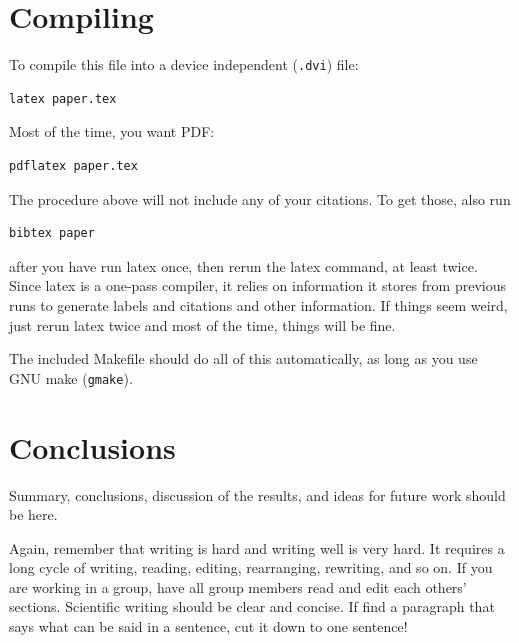 \documentclass[12pt]{article}
\begin{document}
\section{Compiling}
\label{sec:building}

To compile this file into a device independent ({\tt .dvi}) file:

\begin{verbatim}
latex paper.tex
\end{verbatim}

Most of the time, you want PDF:

\begin{verbatim}
pdflatex paper.tex
\end{verbatim}

The procedure above will not include any of your citations.  To get
those, also run
\begin{verbatim}
bibtex paper
\end{verbatim}
after you have run latex once, then rerun the latex command, at least
twice.  Since latex is a one-pass compiler, it relies on information
it stores from previous runs to generate labels and citations and
other information.  If things seem weird, just rerun latex twice and
most of the time, things will be fine.

The included Makefile should do all of this automatically, as long as
you use GNU make ({\tt gmake}).

\section{Conclusions}
\label{sec:conclusions}

Summary, conclusions, discussion of the results, and ideas for future
work should be here.

Again, remember that writing is hard and writing well is very hard.  It
requires a long cycle of writing, reading, editing, rearranging,
rewriting, and so on.  If you are working in a group, have all group
members read and edit each others' sections.  Scientific writing
should be clear and concise.  If find a paragraph that says what can
be said in a sentence, cut it down to one sentence!

\end{document}

